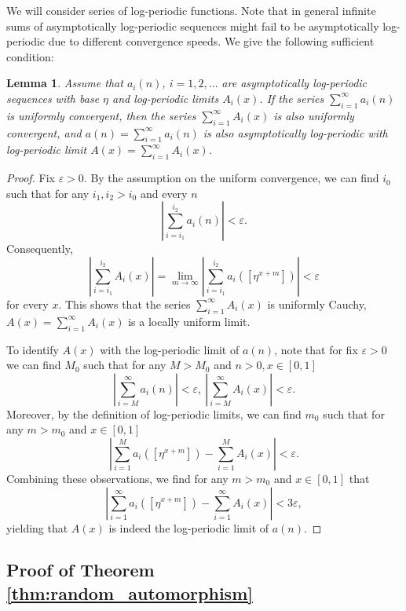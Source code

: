 \documentclass[11pt]{article}
\newtheorem{lemma}[theorem]{Lemma}
\theoremstyle{definition}
\begin{document}
We will consider series of log-periodic functions. Note that in general infinite sums of asymptotically log-periodic sequences might fail to be asymptotically log-periodic due to different convergence speeds. We give the following sufficient condition:

\begin{lemma}\label{lemma:sum_log_periodic}
    Assume that $a_i(n)$, $i=1, 2, \dots$ are asymptotically log-periodic sequences with base $\eta$ and log-periodic limits $A_i(x)$. If the series $\sum_{i=1}^{\infty}a_i(n)$ is uniformly convergent, then the series $\sum_{i=1}^{\infty}A_i(x)$ is also uniformly convergent, and $a(n)=\sum_{i=1}^{\infty}a_i(n)$ is also asymptotically log-periodic with log-periodic limit $A(x)=\sum_{i=1}^{\infty}A_i(x)$.
\end{lemma}

\begin{proof} 
    Fix $\varepsilon>0$. By the assumption on the uniform convergence, we can find $i_0$ such that for any $i_1, i_2>i_0$ and every $n$
    $$\left|\sum_{i=i_1}^{i_2}a_i(n)\right|<\varepsilon.$$
    Consequently,
    $$\left|\sum_{i=i_1}^{i_2}A_i(x)\right| = \lim_{m\to\infty} \left|\sum_{i=i_1}^{i_2}a_i([\eta^{x+m}])\right|<\varepsilon$$
    for every $x$. This shows that the series $\sum_{i=1}^{\infty}A_i(x)$ is uniformly Cauchy, $A(x)=\sum_{i=1}^{\infty}A_i(x)$ is a locally uniform limit.

    To identify $A(x)$ with the log-periodic limit of $a(n)$, note that for fix $\varepsilon>0$ we can find $M_0$ such that for any $M>M_0$ and $n>0, x\in [0, 1]$
    $$\left|\sum_{i=M}^{\infty}a_i(n)\right|<\varepsilon,\ \left|\sum_{i=M}^{\infty}A_i(x)\right|<\varepsilon.$$
    Moreover, by the definition of log-periodic limits, we can find $m_0$ such that for any $m>m_0$ and $x\in [0, 1]$
    $$\left|\sum_{i=1}^{M}a_i([\eta^{x+m}]) - \sum_{i=1}^{M}A_i(x)\right|<\varepsilon.$$
    Combining these observations, we find for any $m>m_0$ and $x\in[0, 1]$ that
    $$\left|\sum_{i=1}^{\infty}a_i([\eta^{x+m}]) - \sum_{i=1}^{\infty}A_i(x)\right|<3\varepsilon,$$
    yielding that $A(x)$ is indeed the log-periodic limit of $a(n)$.
\end{proof}

\subsection{Proof of Theorem \ref{thm:random_automorphism}}
\end{document}
